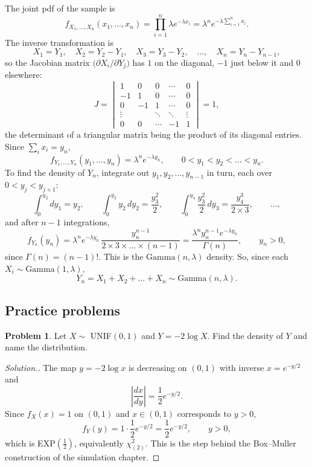\documentclass[11pt,a4paper]{article}
\theoremstyle{definition}
\newtheorem{problemx}{Problem}[subsection]
\newenvironment{problem}{\begin{problemx}}{\end{problemx}}
\newenvironment{solution}
  {\renewcommand{\qedsymbol}{}\begin{proof}[\textit{Solution}.]}
  {\end{proof}}
\begin{document}
The joint pdf of the sample is
\[
f_{X_1,\dots,X_n}(x_1, \dots, x_n) = \prod_{i=1}^n\lambda e^{-\lambda x_i} = \lambda^ne^{-\lambda\sum_{i=1}^nx_i} .
\]
The inverse transformation is
\[
X_1 = Y_1 , \quad X_2 = Y_2 - Y_1 , \quad X_3 = Y_3 - Y_2 , \quad \dots , \quad X_n = Y_n - Y_{n-1} ,
\]
so the Jacobian matrix $\bigl(\partial X_i/\partial Y_j\bigr)$ has $1$ on the diagonal, $-1$ just below it and $0$ elsewhere:
\[
J = \begin{vmatrix}
1 & 0 & 0 & \cdots & 0 \\
-1 & 1 & 0 & \cdots & 0 \\
0 & -1 & 1 & \cdots & 0 \\
\vdots & & \ddots & \ddots & \vdots \\
0 & 0 & \cdots & -1 & 1
\end{vmatrix} = 1 ,
\]
the determinant of a triangular matrix being the product of its diagonal entries. Since $\sum_ix_i = y_n$,
\[
f_{Y_1,\dots,Y_n}(y_1, \dots, y_n) = \lambda^ne^{-\lambda y_n} , \qquad 0 < y_1 < y_2 < \dots < y_n .
\]
To find the density of $Y_n$, integrate out $y_1, y_2, \dots, y_{n-1}$ in turn, each over $0 < y_j < y_{j+1}$:
\[
\int_0^{y_2}dy_1 = y_2 , \qquad \int_0^{y_3}y_2\,dy_2 = \frac{y_3^2}{2} , \qquad \int_0^{y_4}\frac{y_3^2}{2}\,dy_3 = \frac{y_4^3}{2 \times 3} , \qquad \dots ,
\]
and after $n - 1$ integrations,
\[
f_{Y_n}(y_n) = \lambda^ne^{-\lambda y_n}\,\frac{y_n^{n-1}}{2 \times 3 \times \dots \times (n - 1)} = \frac{\lambda^ny_n^{n-1}e^{-\lambda y_n}}{\Gamma(n)} , \qquad y_n > 0 ,
\]
since $\Gamma(n) = (n - 1)!$. This is the $\text{Gamma}(n, \lambda)$ density. So, since each $X_i \sim \text{Gamma}(1, \lambda)$,
\[
Y_n = X_1 + X_2 + \dots + X_n \sim \text{Gamma}(n, \lambda) .
\]

\subsection{Practice problems}

\begin{problem}
Let $X\sim$ UNIF$(0,1)$ and $Y = -2\log X$. Find the density of $Y$ and name the
distribution.
\end{problem}
\begin{solution}
The map $y = -2\log x$ is decreasing on $(0,1)$ with inverse $x = e^{-y/2}$ and
$$\left|\frac{dx}{dy}\right| = \frac12 e^{-y/2}.$$
Since $f_X(x)=1$ on $(0,1)$ and $x\in(0,1)$ corresponds to $y>0$,
$$f_Y(y) = 1\cdot\frac12 e^{-y/2} = \frac12 e^{-y/2},\qquad y>0 ,$$
which is EXP$\left(\tfrac12\right)$, equivalently $\chi^{2}_{(2)}$. This is the
step behind the Box--Muller construction of the simulation chapter.
\end{solution}
\end{document}
